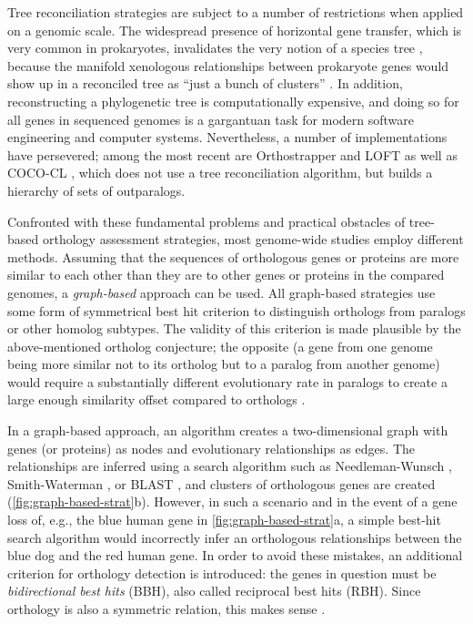 Tree reconciliation strategies are subject to a number of restrictions when
applied on a genomic scale. The widespread presence of horizontal gene transfer,
which is very common in prokaryotes, invalidates the very notion of a species
tree \citep{doolittle2000}, because the manifold xenologous relationships
between prokaryote genes would show up in a reconciled tree as ``just a bunch of
clusters'' . In addition, reconstructing a phylogenetic tree is
computationally expensive, and doing so for all genes in sequenced genomes is a
gargantuan task for modern software engineering and computer systems.
Nevertheless, a number of implementations have persevered; among the most recent
are Orthostrapper \citep{jothi2006} and LOFT \citep{van_der_heijden2007} as well
as \mbox{COCO-CL} \citep{storm2002}, which does not use a tree reconciliation
algorithm, but builds a hierarchy of sets of outparalogs. 

Confronted with these fundamental problems and practical obstacles of tree-based
orthology assessment strategies, most genome-wide studies employ different
methods. Assuming that the sequences of orthologous genes or proteins are more
similar to each other than they are to other genes or proteins in the compared
genomes, a \emph{graph-based} approach can be used. All graph-based strategies
use some form of symmetrical best hit criterion to distinguish orthologs from
paralogs or other homolog subtypes. The validity of this criterion is made
plausible by the above-mentioned ortholog conjecture; the opposite (a gene from
one genome being more similar not to its ortholog but to a paralog from another
genome) would require a substantially different evolutionary rate in paralogs to
create a large enough similarity offset compared to orthologs \citep{koonin2005}.

In a graph-based approach, an algorithm creates a two-dimensional graph with
genes (or proteins) as nodes and evolutionary relationships as edges. The
relationships are inferred using a search algorithm such as Needleman-Wunsch
\citeyearpar{needleman1970}, Smith-Waterman \citeyearpar{smith1981}, or BLAST
\citep{altschul1990}, and clusters of orthologous genes are created
(\autoref{fig:graph-based-strat}b). However, in such a scenario and in the event
of a gene loss of, e.g., the blue human gene in
\autoref{fig:graph-based-strat}a, a simple best-hit search algorithm
would incorrectly infer an orthologous relationships between the blue dog and
the red human gene. In order to avoid these mistakes, an additional criterion
for orthology detection is introduced: the genes in question must be
\emph{bidirectional best hits} (BBH), also called reciprocal best hits (RBH).
Since orthology is also a symmetric relation, this makes sense .

